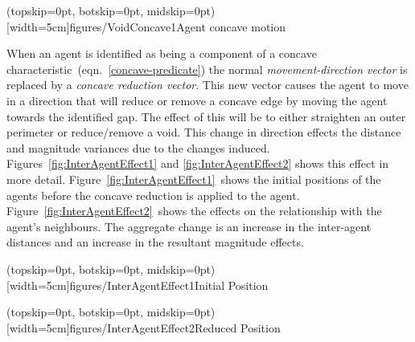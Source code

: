 \documentclass{ieeeaccess}
\begin{document}
\Figure[t!](topskip=0pt, botskip=0pt, midskip=0pt)[width=5cm]{figures/VoidConcave1}{Agent concave motion\label{concave:VoidConcave1}}

When an agent is identified as being a component of a concave
characteristic~(eqn.~\ref{concave-predicate}) the normal \textit{movement-direction vector} is replaced by a \textit{concave reduction vector}. This new vector causes the agent to move in a direction that will reduce or remove a concave edge by moving the agent towards the identified gap. The effect of this will be to either straighten an outer perimeter or reduce/remove a void. This change in direction effects the distance and magnitude variances due to the changes induced. Figures~\ref{fig:InterAgentEffect1} and \ref{fig:InterAgentEffect2} shows this effect in more detail. Figure~\ref{fig:InterAgentEffect1}~shows the initial positions of the agents before the concave reduction is applied to the agent. Figure~\ref{fig:InterAgentEffect2}~shows the effects on the relationship with the agent's neighbours. The aggregate change is an increase in the inter-agent distances and an increase in the resultant magnitude effects.

\Figure[t!](topskip=0pt, botskip=0pt, midskip=0pt)[width=5cm]{figures/InterAgentEffect1}{Initial Position\label{fig:InterAgentEffect1}}

\Figure[t!](topskip=0pt, botskip=0pt, midskip=0pt)[width=5cm]{figures/InterAgentEffect2}{Reduced Position\label{fig:InterAgentEffect2}}
\end{document}
